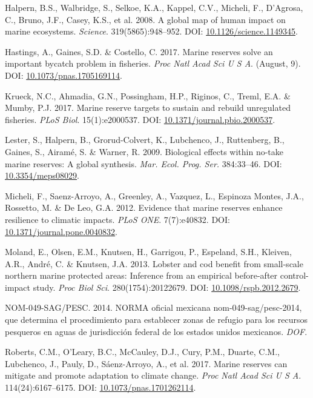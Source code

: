 \documentclass[12pt,]{article}
\begin{document}
\hypertarget{ref-halpern_2008-dK}{}
Halpern, B.S., Walbridge, S., Selkoe, K.A., Kappel, C.V., Micheli, F.,
D'Agrosa, C., Bruno, J.F., Casey, K.S., et al. 2008. A global map of
human impact on marine ecosystems. \emph{Science}. 319(5865):948--952.
DOI:
\href{https://doi.org/10.1126/science.1149345}{10.1126/science.1149345}.

\hypertarget{ref-hastings_2017-sm}{}
Hastings, A., Gaines, S.D. \& Costello, C. 2017. Marine reserves solve
an important bycatch problem in fisheries. \emph{Proc Natl Acad Sci U S
A}. (August, 9). DOI:
\href{https://doi.org/10.1073/pnas.1705169114}{10.1073/pnas.1705169114}.

\hypertarget{ref-krueck_2017-J1}{}
Krueck, N.C., Ahmadia, G.N., Possingham, H.P., Riginos, C., Treml, E.A.
\& Mumby, P.J. 2017. Marine reserve targets to sustain and rebuild
unregulated fisheries. \emph{PLoS Biol}. 15(1):e2000537. DOI:
\href{https://doi.org/10.1371/journal.pbio.2000537}{10.1371/journal.pbio.2000537}.

\hypertarget{ref-lester_2009-Ks}{}
Lester, S., Halpern, B., Grorud-Colvert, K., Lubchenco, J., Ruttenberg,
B., Gaines, S., Airamé, S. \& Warner, R. 2009. Biological effects within
no-take marine reserves: A global synthesis. \emph{Mar. Ecol. Prog.
Ser.} 384:33--46. DOI:
\href{https://doi.org/10.3354/meps08029}{10.3354/meps08029}.

\hypertarget{ref-micheli_2012-EU}{}
Micheli, F., Saenz-Arroyo, A., Greenley, A., Vazquez, L., Espinoza
Montes, J.A., Rossetto, M. \& De Leo, G.A. 2012. Evidence that marine
reserves enhance resilience to climatic impacts. \emph{PLoS ONE}.
7(7):e40832. DOI:
\href{https://doi.org/10.1371/journal.pone.0040832}{10.1371/journal.pone.0040832}.

\hypertarget{ref-moland_2013-VP}{}
Moland, E., Olsen, E.M., Knutsen, H., Garrigou, P., Espeland, S.H.,
Kleiven, A.R., André, C. \& Knutsen, J.A. 2013. Lobster and cod benefit
from small-scale northern marine protected areas: Inference from an
empirical before-after control-impact study. \emph{Proc Biol Sci}.
280(1754):20122679. DOI:
\href{https://doi.org/10.1098/rspb.2012.2679}{10.1098/rspb.2012.2679}.

\hypertarget{ref-nom049sagpesc_2014-V6}{}
NOM-049-SAG/PESC. 2014. NORMA oficial mexicana nom-049-sag/pesc-2014,
que determina el procedimiento para establecer zonas de refugio para los
recursos pesqueros en aguas de jurisdicción federal de los estados
unidos mexicanos. \emph{DOF}.

\hypertarget{ref-roberts_2017-J9}{}
Roberts, C.M., O'Leary, B.C., McCauley, D.J., Cury, P.M., Duarte, C.M.,
Lubchenco, J., Pauly, D., Sáenz-Arroyo, A., et al. 2017. Marine reserves
can mitigate and promote adaptation to climate change. \emph{Proc Natl
Acad Sci U S A}. 114(24):6167--6175. DOI:
\href{https://doi.org/10.1073/pnas.1701262114}{10.1073/pnas.1701262114}.
\end{document}
